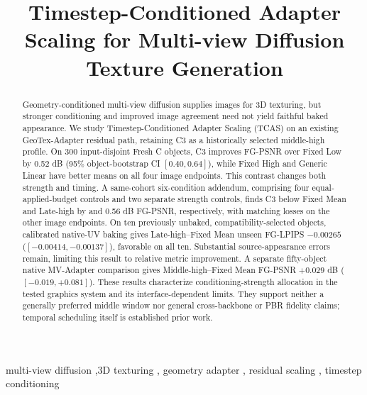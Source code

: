 \documentclass[times,twocolumn,final]{elsarticle}
\providecommand{\DIFadd}[1]{{\protect\color{blue} \sf #1}} %
\providecommand{\DIFaddbegin}{} %
\providecommand{\DIFaddend}{} %
\begin{document}
\begin{frontmatter}

\title{Timestep-Conditioned Adapter Scaling for Multi-view Diffusion Texture Generation}


\begin{abstract}
  \DIFaddbegin \DIFadd{Geometry-conditioned multi-view diffusion supplies images }\DIFaddend for 3D   \DIFaddbegin \DIFadd{texturing, but stronger conditioning and improved image agreement need not yield faithful baked appearance. We study }\DIFaddend Timestep-Conditioned   \DIFaddbegin \DIFadd{Adapter Scaling (TCAS) on an existing GeoTex-Adapter residual path, retaining C3 as a historically selected middle-high profile. On 300 input-disjoint Fresh C objects, }\DIFaddend C3   \DIFaddbegin \DIFadd{improves FG-PSNR over Fixed Low by 0.52 dB (95\% object-bootstrap CI $[0.40,0.64]$), while Fixed High and Generic Linear have better means on all four image endpoints. This contrast changes both strength and timing. A same-cohort six-condition addendum, comprising four equal-applied-budget controls and two separate strength controls, finds C3 below Fixed Mean and Late-high }\DIFaddend by   \DIFaddbegin \DIFadd{0.13 and 0.56 dB FG-PSNR, respectively, with matching losses on the other image endpoints. On ten previously unbaked, compatibility-selected objects, calibrated native-UV baking gives Late-high--Fixed Mean unseen FG-LPIPS $-0.00265$ ($[-0.00414,-0.00137]$), favorable on all ten. Substantial source-appearance errors remain, limiting this result to relative metric improvement. A separate fifty-object native MV-Adapter comparison gives Middle-high--Fixed Mean FG-PSNR $+0.029$ dB ($[-0.019,+0.081]$)}\DIFaddend . These results   \DIFaddbegin \DIFadd{characterize conditioning-strength allocation in the tested graphics system and its interface-dependent limits. They support neither a generally preferred middle window nor general cross-backbone or PBR fidelity claims; temporal scheduling itself is established prior work}\DIFaddend .
\end{abstract}

\begin{keyword}
\KWD
multi-view diffusion   \sep 3D   \DIFaddbegin \DIFadd{texturing }\DIFaddend \sep   \DIFaddbegin \DIFadd{geometry adapter }\DIFaddend \sep   \DIFaddbegin \DIFadd{residual }\DIFaddend scaling \sep   \DIFaddbegin \DIFadd{timestep conditioning
}\DIFaddend \end{keyword}

\end{frontmatter}
\end{document}
